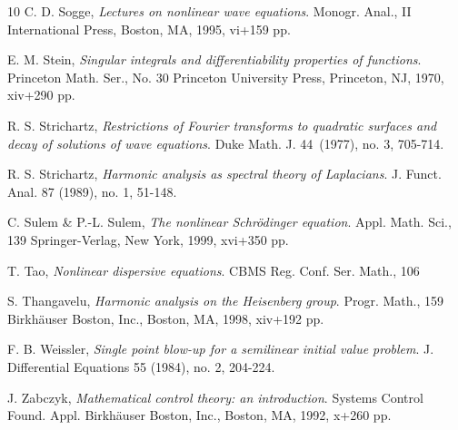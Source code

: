 \documentclass[11pt,letter]{amsart}
\numberwithin{equation}{section}
\numberwithin{equation}{section}
\begin{document}
\begin{thebibliography}{10}
C. D. Sogge,  \emph{Lectures on nonlinear wave equations}.
Monogr. Anal., II
International Press, Boston, MA, 1995, vi+159 pp.

E. M. Stein, \emph{Singular integrals and differentiability properties of functions}.
Princeton Math. Ser., No. 30
Princeton University Press, Princeton, NJ, 1970, xiv+290 pp.


R. S. Strichartz, \emph{Restrictions of Fourier transforms to quadratic surfaces and decay of solutions of wave equations}.
Duke Math. J. 44~(1977), no. 3, 705-714.

R. S. Strichartz, \emph{Harmonic analysis as spectral theory of Laplacians}.
J. Funct. Anal. 87 (1989), no. 1, 51-148.

C. Sulem \& P.-L. Sulem, \emph{The nonlinear Schr\"odinger equation}.
Appl. Math. Sci., 139
Springer-Verlag, New York, 1999, xvi+350 pp.

T. Tao, \emph{Nonlinear dispersive equations}.
CBMS Reg. Conf. Ser. Math., 106

S. Thangavelu, \emph{Harmonic analysis on the Heisenberg group}.
Progr. Math., 159
Birkh\"auser Boston, Inc., Boston, MA, 1998, xiv+192 pp.

F. B. Weissler, \emph{Single point blow-up for a semilinear initial value problem}.
J. Differential Equations 55 (1984), no. 2, 204-224.

J. Zabczyk, \emph{Mathematical control theory: an introduction}.
Systems Control Found. Appl.
Birkh\"auser Boston, Inc., Boston, MA, 1992, x+260 pp.




\end{thebibliography}
\end{document}
